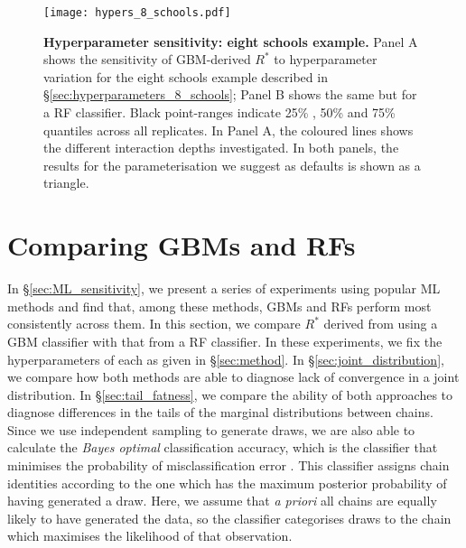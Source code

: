 \documentclass{article}
\begin{document}
\begin{figure}[!htb]
	\centerline{\texttt{[image: hypers\_8\_schools.pdf]}}
	\caption{\textbf{Hyperparameter sensitivity: eight schools example.} Panel A shows the sensitivity of GBM-derived $R^*$ to hyperparameter variation for the eight schools example described in \S\ref{sec:hyperparameters_8_schools}; Panel B shows the same but for a RF classifier. Black point-ranges indicate 25\% , 50\% and 75\% quantiles across all replicates. In Panel A, the coloured lines shows the different interaction depths investigated. In both panels, the results for the parameterisation we suggest as defaults is shown as a triangle.}
	\label{fig:hypers_8_schools}
\end{figure}

\color{black}

\color{red}
\section{Comparing GBMs and RFs}\label{sec:comparison_gbm_rf}
In \S\ref{sec:ML_sensitivity}, we present a series of experiments using popular ML methods and find that, among these methods, GBMs and RFs perform most consistently across them. In this section, we compare $R^*$ derived from using a GBM classifier with that from a RF classifier. In these experiments, we fix the hyperparameters of each as given in \S\ref{sec:method}. In \S\ref{sec:joint_distribution}, we compare how both methods are able to diagnose lack of convergence in a joint distribution. In \S\ref{sec:tail_fatness}, we compare the ability of both approaches to diagnose differences in the tails of the marginal distributions between chains. Since we use independent sampling to generate draws, we are also able to calculate the \textit{Bayes optimal} classification accuracy, which is the classifier that minimises the probability of misclassification error \citep{devroye2013probabilistic}. This classifier assigns chain identities according to the one which has the maximum posterior probability of having generated a draw. Here, we assume that \textit{a priori} all chains are equally likely to have generated the data, so the classifier categorises draws to the chain which maximises the likelihood of that observation.
\end{document}
